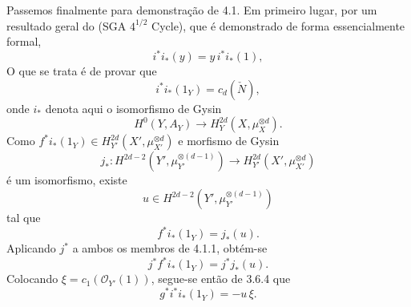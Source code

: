 Passemos finalmente para demonstração de 4.1. Em primeiro lugar, por um resultado geral do (SGA $4^{1/2}$ Cycle), que é demonstrado de forma essencialmente formal,
\[
i^*i_*(y)=y\,i^*i_*(1),
\]
O que se trata é de provar que
\[
i^*i_*(1_Y)=c_d(\check N),
\]
onde $i_*$ denota aqui o isomorfismo de Gysin
\[
H^0(Y,A_Y)\to H_Y^{2d}(X,\mu_X^{\otimes d}).
\]
Como $f^*i_*(1_Y)\in H_{Y'}^{2d}(X',\mu_{X'}^{\otimes d})$ e morfismo de Gysin
\[
j_*:H^{2d-2}(Y',\mu_{Y'}^{\otimes(d-1)})
\to H_{Y'}^{2d}(X',\mu_{X'}^{\otimes d})
\]
é um isomorfismo, existe
\[
u\in H^{2d-2}(Y',\mu_{Y'}^{\otimes(d-1)})
\]
tal que
\[
f^*i_*(1_Y)=j_*(u).
\tag{4.1.1}
\]
Aplicando $j^*$ a ambos os membros de 4.1.1, obtém-se
\[
j^*f^*i_*(1_Y)=j^*j_*(u).
\]
Colocando $\xi=c_1(\mathcal O_{Y'}(1))$, segue-se então de 3.6.4 que
\[
g^*i^*i_*(1_Y)=-u\,\xi.
\tag{4.1.2}
\]
